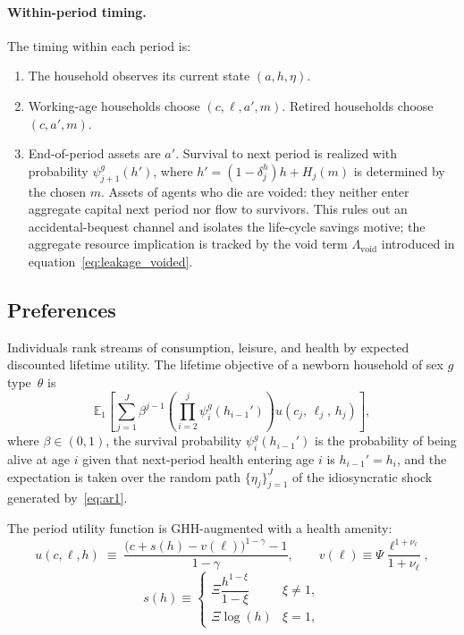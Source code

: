\documentclass[12pt,a4paper]{article}
\newcommand{\E}{\mathbb{E}}
\begin{document}
\paragraph{Within-period timing.}
The timing within each period is:
\begin{enumerate}
\item The household observes its current state $(a, h, \eta)$.
\item Working-age households choose $(c, \ell, a', m)$. Retired households choose $(c, a', m)$.
\item End-of-period assets are $a'$. Survival to next period is realized with probability $\psi_{j+1}^{g}(h')$, where $h' = (1-\delta_j^h) h + H_j(m)$ is determined by the chosen $m$. Assets of agents who die are voided: they neither enter aggregate capital next period nor flow to survivors. This rules out an accidental-bequest channel and isolates the life-cycle savings motive; the aggregate resource implication is tracked by the void term $\Lambda_{\mathrm{void}}$ introduced in equation~\eqref{eq:leakage_voided}.
\end{enumerate}


\subsection{Preferences}
\label{subsec:preferences}

Individuals rank streams of consumption, leisure, and health by expected discounted lifetime utility. The lifetime objective of a newborn household of sex $g$ type~$\theta$  is
\begin{equation}
\label{eq:lifetime_utility}
\E_1 \left[\sum_{j=1}^{J} \beta^{j-1} \left(\prod_{i=2}^{j} \psi_{i}^{g}(h_{i-1}')\right) u(c_j,\, \ell_j,\, h_j)\right],
\end{equation}
where $\beta \in (0,1)$, the survival probability $\psi_{i}^{g}(h_{i-1}')$ is the probability of being alive at age $i$ given that next-period health entering age $i$ is $h_{i-1}' = h_i$, and the expectation is taken over the random path $\{\eta_j\}_{j=1}^{J}$ of the idiosyncratic shock generated by~\eqref{eq:ar1}.
 
The period utility function is GHH-augmented with a health amenity:
\begin{equation}
\label{eq:utility}
u(c, \ell, h) \;\equiv\; \frac{\bigl(c + s(h) - v(\ell)\bigr)^{1-\gamma} - 1}{1 - \gamma},
\qquad
v(\ell) \equiv \Psi \frac{\ell^{1+\nu_\ell}}{1+\nu_\ell},
\end{equation}
\begin{equation}
    s(h) \equiv
\begin{cases}
\Xi \dfrac{h^{1-\xi}}{1-\xi} & \xi \neq 1,\\[6pt]
\Xi \log(h) & \xi = 1,
\end{cases}
\end{equation}
\end{document}
